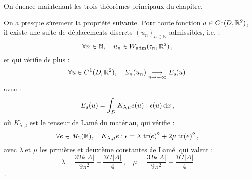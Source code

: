 On énonce maintenant les trois théorèmes principaux du chapitre.
\begin{theorem}
    On a presque sûrement la propriété suivante. Pour  toute fonction $u \in C^1(D, \mathbb{R}^2)$, il
    existe une suite de déplacements discrets $(u_n)_{n \in \mathbb{N}}$ admissibles, i.e. :
    $$\forall n \in \mathbb{N}, \quad u_n \in W_{\text{\upshape adm}} (\tau_n, \mathbb{R}^2) \,,$$
    et qui vérifie de plus :
    $$\forall u \in  C^1 (D, \mathbb{R}^2), \quad E_n(u_n) \underset{n \rightarrow +\infty}
    \longrightarrow E_s(u)\, $$
    avec :
    $$ E_s(u) = \int_{D} K_{\lambda,\mu} e(u):e(u) \diff x \,, $$
    où $K_{\lambda,\mu}$ est le tenseur de Lamé du matériau, qui vérifie :
    $$ \forall e \in M_2(\mathbb{R}), \quad K_{\lambda,\mu} e: e = \lambda \text{ \upshape tr}(e)^2 + 2 \mu \text{ \upshape tr}(e)^2 \,, $$
    avec $\lambda$ et $\mu$ les prmières et deuxième constantes de Lamé, qui valent :
    $$ \lambda = \frac{32 k \vert A \vert}{9 \pi^2} + \frac{3G \vert A \vert}{4}\,, \quad \mu =
    \frac{32 k \vert A \vert}{9 \pi^2} - \frac{3G \vert A \vert}{4} $$ \,.
\end{theorem}

